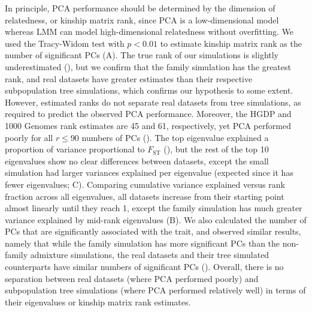 \documentclass[9pt,lineno]{elife}
\newcommand{\Fst}{F_{\text{ST}}}
\begin{document}
In principle, PCA performance should be determined by the dimension of relatedness, or kinship matrix rank, since PCA is a low-dimensional model whereas LMM can model high-dimensional relatedness without overfitting.
We used the Tracy-Widom test \citep{patterson_population_2006} with $p < 0.01$ to estimate kinship matrix rank as the number of significant PCs (A).
The true rank of our simulations is slightly underestimated (), but we confirm that the family simulation has the greatest rank, and real datasets have greater estimates than their respective subpopulation tree simulations, which confirms our hypothesis to some extent.
However, estimated ranks do not separate real datasets from tree simulations, as required to predict the observed PCA performance.
Moreover, the HGDP and 1000 Genomes rank estimates are 45 and 61, respectively, yet PCA performed poorly for all $r \le 90$ numbers of PCs ().
The top eigenvalue explained a proportion of variance proportional to $\Fst$ (), but the rest of the top 10 eigenvalues show no clear differences between datasets, except the small simulation had larger variances explained per eigenvalue (expected since it has fewer eigenvalues; C).
Comparing cumulative variance explained versus rank fraction across all eigenvalues, all datasets increase from their starting point almost linearly until they reach 1, except the family simulation has much greater variance explained by mid-rank eigenvalues (B).
We also calculated the number of PCs that are significantly associated with the trait, and observed similar results, namely that while the family simulation has more significant PCs than the non-family admixture simulations, the real datasets and their tree simulated counterparts have similar numbers of significant PCs ().
Overall, there is no separation between real datasets (where PCA performed poorly) and subpopulation tree simulations (where PCA performed relatively well) in terms of their eigenvalues or kinship matrix rank estimates.
\end{document}
